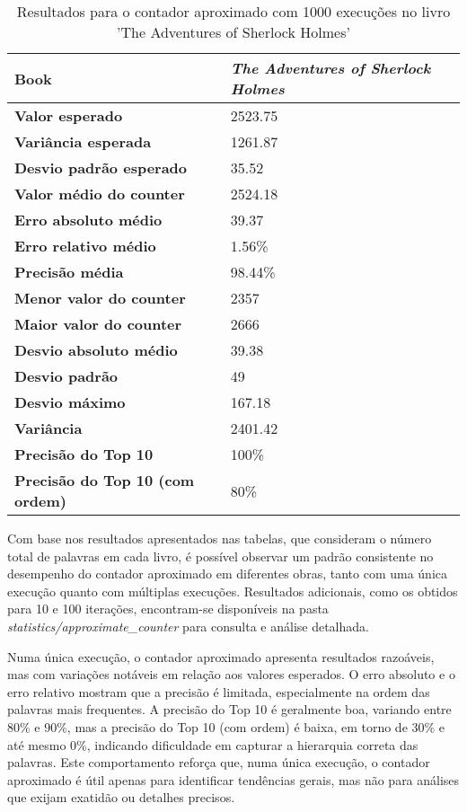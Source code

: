 \documentclass[shortpaper, portugues, times, mirror]{revdetua}
\begin{document}
\begin{table}[H]
\centering
\begin{tabular}{|l|p{2cm}|}
\hline
\textbf{Book}            & \textit{The Adventures of  Sherlock Holmes}\\ \hline
\textbf{Valor esperado}         & 2523.75\\ \hline
\textbf{Variância esperada}& 1261.87\\ \hline
\textbf{Desvio padrão esperado}   & 35.52\\ \hline
\hline
\textbf{Valor médio do counter}   & 2524.18\\ \hline
\textbf{Erro absoluto médio}   & 39.37\\ \hline
\textbf{Erro relativo médio}   & 1.56\%\\ \hline
\textbf{Precisão média}   & 98.44\%\\ \hline
\textbf{Menor valor do counter}   & 2357\\ \hline
\textbf{Maior valor do counter}   & 2666\\ \hline
\textbf{Desvio absoluto médio}   & 39.38\\ \hline
\textbf{Desvio padrão}   & 49\\ \hline
\textbf{Desvio máximo}   & 167.18\\ \hline
\textbf{Variância}   & 2401.42\\ \hline
\textbf{Precisão do Top 10}   & 100\%\\ \hline
\textbf{Precisão do Top 10 (com ordem)}   & 80\%\\ \hline
\end{tabular}
\caption{Resultados para o contador aproximado com 1000 execuções no livro 'The Adventures of Sherlock Holmes'}
\label{tab:approximate}
\end{table}

Com base nos resultados apresentados nas tabelas, que consideram o número total de palavras em cada livro, é possível observar um padrão consistente no desempenho do contador aproximado em diferentes obras, tanto com uma única execução quanto com múltiplas execuções. Resultados adicionais, como os obtidos para 10 e 100 iterações, encontram-se disponíveis na pasta \textit{statistics/approximate\_counter} para consulta e análise detalhada.

Numa única execução, o contador aproximado apresenta resultados razoáveis, mas com variações notáveis em relação aos valores esperados. O erro absoluto e o erro relativo mostram que a precisão é limitada, especialmente na ordem das palavras mais frequentes. A precisão do Top 10 é geralmente boa, variando entre 80\% e 90\%, mas a precisão do Top 10 (com ordem) é baixa, em torno de 30\% e até mesmo 0\%, indicando dificuldade em capturar a hierarquia correta das palavras. Este comportamento reforça que, numa única execução, o contador aproximado é útil apenas para identificar tendências gerais, mas não para análises que exijam exatidão ou detalhes precisos.
\end{document}
